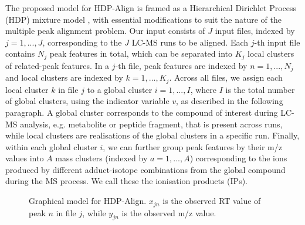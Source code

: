 The proposed model for HDP-Align is framed as a Hierarchical Dirichlet Process (HDP) mixture model \cite{Teh2006}, with essential modifications to suit the nature of the multiple peak alignment problem. Our input consists of $J$ input files, indexed by $j=1,...,J$, corresponding to the $J$ LC-MS runs to be aligned. Each $j$-th input file contains $N_j$ peak features in total, which can be separated into $K_j$ local clusters of related-peak features. In a $j$-th file, peak features are indexed by $n=1,...,N_j$ and local clusters are indexed by $k=1,...,K_j$. Across all files, we assign each local cluster $k$ in file $j$ to a global cluster $i=1,...,I$, where $I$ is the total number of global clusters, using the indicator variable $v$, as described in the following paragraph. A global cluster corresponds to the compound of interest during LC-MS analysis, e.g. metabolite or peptide fragment, that is present across runs, while local clusters are realisations of the global clusters in a specific run. Finally, within each global cluster $i$, we can further group peak features by their m/z values into $A$ mass clusters (indexed by $a=1,...,A$) corresponding to the ions produced by different adduct-isotope combinations from the global compound during the MS process. We call these the ionisation products (IPs). 

\begin{figure}
	\begin{center}
		
	\end{center}
	\caption{Graphical model for HDP-Align. $x_{jn}$ is the observed RT value of peak $n$ in file $j$, while $y_{jn}$ is the observed m/z value.\label{fig-platediagram}}
\end{figure} 

